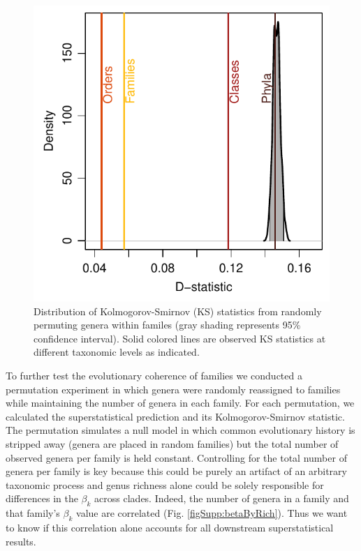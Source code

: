 \documentclass[12pt]{article}
\let\citep=\cite
\begin{document}
\begin{figure}[!h]
  \centering
  \includegraphics[scale=1]{../../fig_dStat.pdf}
  \caption[Goodness of superstatistical theory fit]{Distribution of
    Kolmogorov-Smirnov (KS) statistics from randomly permuting genera
    within familes (gray shading represents 95\% confidence
    interval). Solid colored lines are observed KS statistics at
    different taxonomic levels as indicated.}
  \label{fig:dStat}
\end{figure}

To further test the evolutionary coherence of families we conducted a
permutation experiment in which genera were randomly reassigned to
families while maintaining the number of genera in each family. For
each permutation, we calculated the superstatistical prediction and
its Kolmogorov-Smirnov statistic. The permutation simulates a null
model in which common evolutionary history is stripped away (genera
are placed in random families) but the total number of observed genera
per family is held constant. Controlling for the total number of
genera per family is key because this could be purely an artifact of
an arbitrary taxonomic process \citep{yule1925, berlin1966, hey2001,
  capocci2008} and genus richness alone could be solely responsible
for differences in the $\beta_k$ across clades. Indeed, the number of
genera in a family and that family's $\beta_k$ value are correlated
(Fig. \ref{figSupp:betaByRich}). Thus we want to know if this
correlation alone accounts for all downstream superstatistical
results.
\end{document}
